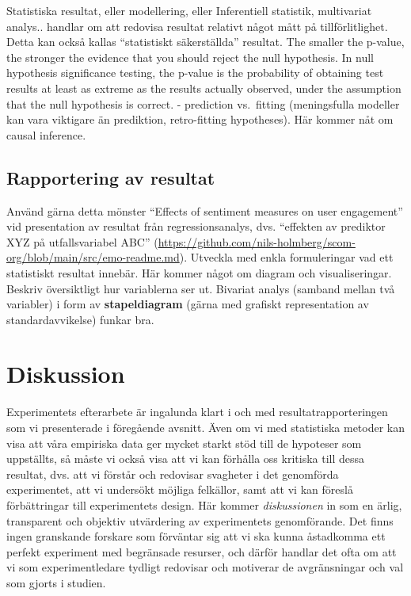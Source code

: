 \documentclass[
]{book}
\begin{document}
Statistiska resultat, eller modellering, eller Inferentiell statistik, multivariat analys.. handlar om att redovisa resultat relativt något mått på tillförlitlighet. Detta kan också kallas ``statistiskt säkerställda'' resultat. The smaller the p-value, the stronger the evidence that you should reject the null hypothesis. In null hypothesis significance testing, the p-value is the probability of obtaining test results at least as extreme as the results actually observed, under the assumption that the null hypothesis is correct. - prediction vs.~fitting (meningsfulla modeller kan vara viktigare än prediktion, retro-fitting hypotheses). Här kommer nåt om causal inference.

\hypertarget{sub08.1.3}{%
\subsection{Rapportering av resultat}\label{sub08.1.3}}

Använd gärna detta mönster ``Effects of sentiment measures on user engagement'' vid presentation av resultat från regressionsanalys, dvs. ``effekten av prediktor XYZ på utfallsvariabel ABC'' (\url{https://github.com/nils-holmberg/scom-org/blob/main/src/emo-readme.md}). Utveckla med enkla formuleringar vad ett statistiskt resultat innebär. Här kommer något om diagram och visualiseringar. Beskriv översiktligt hur variablerna ser ut. Bivariat analys (samband mellan två variabler) i form av \textbf{stapeldiagram} (gärna med grafiskt representation av standardavvikelse) funkar bra.

\hypertarget{sec08.2}{%
\section{Diskussion}\label{sec08.2}}

Experimentets efterarbete är ingalunda klart i och med resultatrapporteringen som vi presenterade i föregående avsnitt. Även om vi med statistiska metoder kan visa att våra empiriska data ger mycket starkt stöd till de hypoteser som uppställts, så måste vi också visa att vi kan förhålla oss kritiska till dessa resultat, dvs. att vi förstår och redovisar svagheter i det genomförda experimentet, att vi undersökt möjliga felkällor, samt att vi kan föreslå förbättringar till experimentets design. Här kommer \emph{diskussionen} in som en ärlig, transparent och objektiv utvärdering av experimentets genomförande. Det finns ingen granskande forskare som förväntar sig att vi ska kunna åstadkomma ett perfekt experiment med begränsade resurser, och därför handlar det ofta om att vi som experimentledare tydligt redovisar och motiverar de avgränsningar och val som gjorts i studien.
\end{document}
